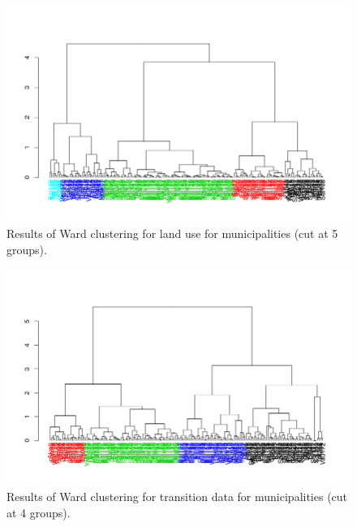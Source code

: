 

\begin{figure}[h!]
\centering
 \includegraphics[width=\textwidth]{thesis/figures/clustering_values.png}
 \caption{Results of Ward clustering for land use for municipalities (cut at 5 groups).}
 \label{fig:clustervals}
\end{figure}

\begin{figure}[h!]
    \includegraphics[width=\textwidth]{thesis/figures/clustering_trans.png}
  \caption{Results of Ward clustering for transition data for municipalities (cut at 4 groups).}
  \label{fig:clustertrans}
\end{figure}



